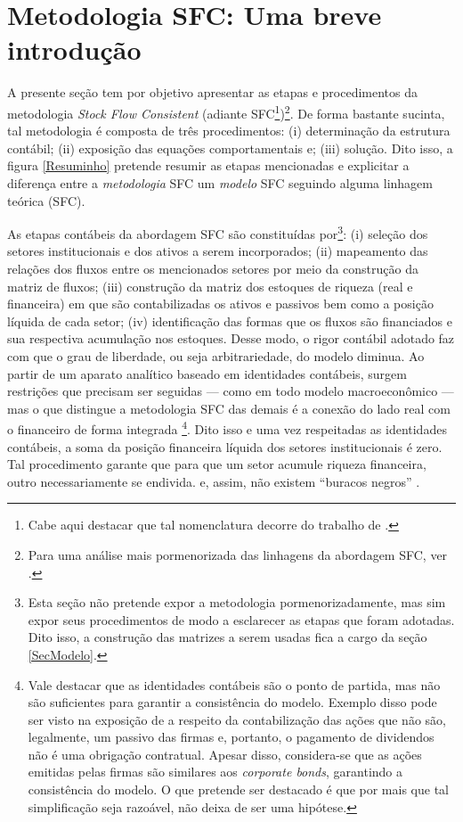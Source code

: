 \section{Metodologia SFC: Uma breve introdução}
\label{IntroSFC}


A presente seção tem por objetivo apresentar as etapas e procedimentos da metodologia \textit{Stock Flow Consistent} (adiante SFC\footnote{Cabe aqui destacar que tal nomenclatura decorre do trabalho de \textcite{dos_santos_keynesian_2006}.})\footnote{Para uma análise mais pormenorizada das linhagens da abordagem SFC, ver \textcite{caverzasi_stock-flow_2013}.}. De forma bastante sucinta, tal metodologia é composta de três procedimentos: (i) determinação da estrutura contábil; (ii) exposição das equações comportamentais e; (iii) solução. Dito isso, a figura \ref{Resuminho} pretende resumir as etapas mencionadas e explicitar a diferença entre a \textit{metodologia} SFC um \textit{modelo} SFC seguindo alguma linhagem teórica (SFC). 



As etapas contábeis da abordagem SFC são constituídas por\footnote{Esta seção não pretende expor a metodologia pormenorizadamente, mas sim expor seus procedimentos de modo a esclarecer as etapas que foram adotadas. Dito isso, a construção das matrizes a serem usadas fica a cargo da seção \ref{SecModelo}.}: (i) seleção dos setores institucionais e dos ativos a serem incorporados; (ii) mapeamento das relações dos fluxos entre os mencionados setores por meio da construção da matriz de fluxos; (iii) construção da matriz dos estoques de riqueza (real e financeira) em que são contabilizadas os ativos e passivos  bem como a posição líquida de cada setor; (iv) identificação das formas que os fluxos são financiados e sua respectiva acumulação nos estoques. Desse modo, o rigor contábil adotado faz com que o grau de liberdade, ou seja arbitrariedade, do modelo diminua. 
Ao partir de um aparato analítico baseado em identidades contábeis, surgem restrições que precisam ser seguidas  --- como em todo modelo macroeconômico --- mas o que distingue a metodologia SFC das demais é a conexão do lado real com o financeiro de forma integrada
\footnote{Vale destacar que as identidades contábeis são o ponto de partida, mas não são suficientes para garantir a consistência do modelo. Exemplo disso pode ser visto na exposição de  \textcite[p.~27--8]{godley_monetary_2007}  a respeito da contabilização das ações que não são, legalmente, um passivo das firmas e, portanto, o pagamento de dividendos não é uma obrigação contratual. Apesar disso, considera-se que as ações emitidas pelas firmas são similares aos \textit{corporate bonds}, garantindo a consistência do modelo. O que pretende ser destacado é que por mais que tal simplificação seja razoável, não deixa de ser uma hipótese.}. 
Dito isso e uma vez respeitadas as identidades contábeis, a soma da posição financeira líquida dos setores institucionais é zero. Tal procedimento garante que para que um setor acumule riqueza financeira, outro necessariamente se endivida. e, assim, não existem ``buracos negros'' \cite{godley_money_1996}. 


